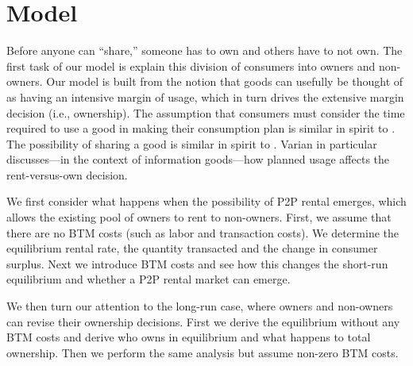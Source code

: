 \documentclass[11pt]{article}
\begin{document}

\section{Model} \label{sec:model}

Before anyone can ``share,'' someone has to own and others have to not own.
The first task of our model is explain this division of consumers into owners and non-owners. 
Our model is built from the notion that goods can usefully be thought of as having an intensive margin of usage, which in turn drives the extensive margin decision (i.e., ownership). 
The assumption that consumers must consider the time required to use a good in making their consumption plan is similar in spirit to \cite{becker1965theory}.
The possibility of sharing a good is similar in spirit to \cite{varian2000}.
Varian in particular discusses---in the context of information goods---how planned usage affects the rent-versus-own decision. 

We first consider what happens when the possibility of P2P rental emerges, which allows the existing pool of owners to rent to non-owners. 
First, we assume that there are no BTM costs (such as labor and transaction costs).
We determine the equilibrium rental rate, the quantity transacted and the change in consumer surplus. 
Next we introduce BTM costs and see how this changes the short-run equilibrium and whether a P2P rental market can emerge. 

We then turn our attention to the long-run case, where owners and non-owners can revise their ownership decisions.
First we derive the equilibrium without any BTM costs and derive who owns in equilibrium and what happens to total ownership.
Then we perform the same analysis but assume non-zero BTM costs. 
\end{document}
